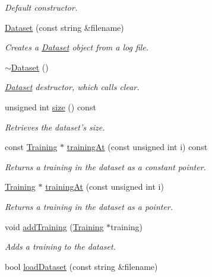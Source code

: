\begin{DoxyCompactItemize}
\begin{DoxyCompactList}\small\item\em Default constructor. \end{DoxyCompactList}\item 
\hyperlink{class_dataset_a299c3198f6325d0c627aa029ed24e2e5}{Dataset} (const string \&filename)
\begin{DoxyCompactList}\small\item\em Creates a \hyperlink{class_dataset}{Dataset} object from a log file. \end{DoxyCompactList}\item 
\hyperlink{class_dataset_a7f38b79ccbf9ada90d68d3a50250b193}{$\sim$\-Dataset} ()
\begin{DoxyCompactList}\small\item\em \hyperlink{class_dataset}{Dataset} destructor, which calls clear. \end{DoxyCompactList}\item 
unsigned int \hyperlink{class_dataset_a389855d6b88c8257041bcbc489759aae}{size} () const 
\begin{DoxyCompactList}\small\item\em Retrieves the dataset's size. \end{DoxyCompactList}\item 
const \hyperlink{class_training}{Training} $\ast$ \hyperlink{class_dataset_af776f6046312827aed048d641e29449b}{training\-At} (const unsigned int i) const 
\begin{DoxyCompactList}\small\item\em Returns a training in the dataset as a constant pointer. \end{DoxyCompactList}\item 
\hyperlink{class_training}{Training} $\ast$ \hyperlink{class_dataset_adf05adb75cc0692104dc809ab030e967}{training\-At} (const unsigned int i)
\begin{DoxyCompactList}\small\item\em Returns a training in the dataset as a pointer. \end{DoxyCompactList}\item 
void \hyperlink{class_dataset_a3dd1b2db5490c75c59b23680bb7b8b53}{add\-Training} (\hyperlink{class_training}{Training} $\ast$training)
\begin{DoxyCompactList}\small\item\em Adds a training to the dataset. \end{DoxyCompactList}\item 
bool \hyperlink{class_dataset_ac76fd063f6eca24ec277bd4f14cc0484}{load\-Dataset} (const string \&filename)

\end{DoxyCompactItemize}
